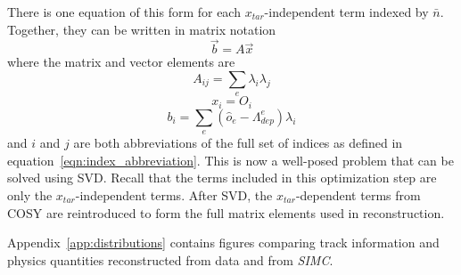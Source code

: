 There is one equation of this form for each $x_{tar}$-independent term indexed
by $\bar{n}$.
Together, they can be written in matrix notation
\begin{equation}
    \vec{b} = A \vec{x}
\end{equation}
where the matrix and vector elements are
\begin{equation}
    A_{ij} = \sum_e \lambda_i \lambda_j
\end{equation}
\begin{equation}
    x_i = O_i
\end{equation}
\begin{equation}
    b_i = \sum_e(\hat{o}_e - \Lambda^e_{dep}) \lambda_i
\end{equation}
and $i$ and $j$ are both abbreviations of the full set of indices as defined in
equation~\ref{eqn:index_abbreviation}.
This is now a well-posed problem that can be solved using SVD.
Recall that the terms included in this optimization step are only the
$x_{tar}$-independent terms.
After SVD, the $x_{tar}$-dependent terms from COSY are reintroduced to form the
full matrix elements used in reconstruction.

Appendix~\ref{app:distributions} contains figures comparing track information
and physics quantities reconstructed from data and from \textit{SIMC}.
